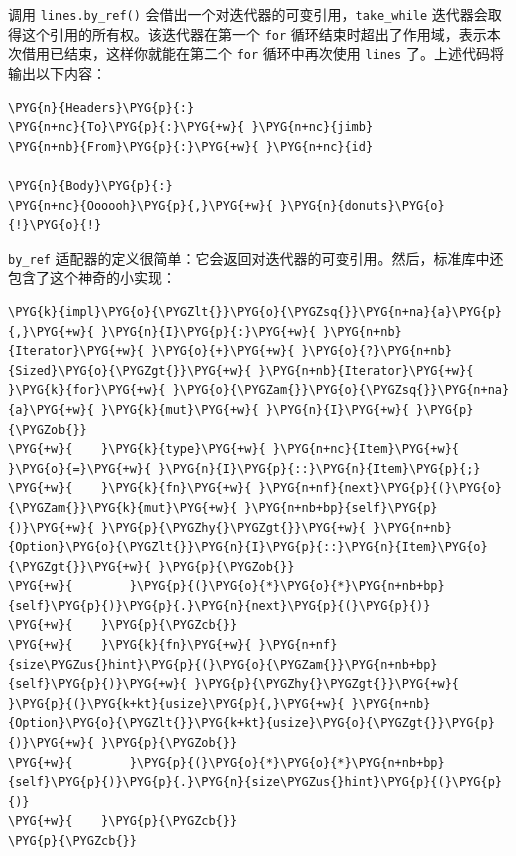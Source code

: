 调用 \texttt{lines.by\_ref()} 会借出一个对迭代器的可变引用，\texttt{take\_while} 迭代器会取得这个引用的所有权。该迭代器在第一个 \texttt{for} 循环结束时超出了作用域，表示本次借用已结束，这样你就能在第二个 \texttt{for} 循环中再次使用 \texttt{lines} 了。上述代码将输出以下内容：

\begin{Verbatim}[commandchars=\\\{\},breaklines=true,breakanywhere=true,fontsize=\codefont,xleftmargin=17bp]
\PYG{n}{Headers}\PYG{p}{:}
\PYG{n+nc}{To}\PYG{p}{:}\PYG{+w}{ }\PYG{n+nc}{jimb}
\PYG{n+nb}{From}\PYG{p}{:}\PYG{+w}{ }\PYG{n+nc}{id}

\PYG{n}{Body}\PYG{p}{:}
\PYG{n+nc}{Oooooh}\PYG{p}{,}\PYG{+w}{ }\PYG{n}{donuts}\PYG{o}{!}\PYG{o}{!}
\end{Verbatim}

\texttt{by\_ref} 适配器的定义很简单：它会返回对迭代器的可变引用。然后，标准库中还包含了这个神奇的小实现：

\begin{Verbatim}[commandchars=\\\{\},breaklines=true,breakanywhere=true,fontsize=\codefont,xleftmargin=17bp]
\PYG{k}{impl}\PYG{o}{\PYGZlt{}}\PYG{o}{\PYGZsq{}}\PYG{n+na}{a}\PYG{p}{,}\PYG{+w}{ }\PYG{n}{I}\PYG{p}{:}\PYG{+w}{ }\PYG{n+nb}{Iterator}\PYG{+w}{ }\PYG{o}{+}\PYG{+w}{ }\PYG{o}{?}\PYG{n+nb}{Sized}\PYG{o}{\PYGZgt{}}\PYG{+w}{ }\PYG{n+nb}{Iterator}\PYG{+w}{ }\PYG{k}{for}\PYG{+w}{ }\PYG{o}{\PYGZam{}}\PYG{o}{\PYGZsq{}}\PYG{n+na}{a}\PYG{+w}{ }\PYG{k}{mut}\PYG{+w}{ }\PYG{n}{I}\PYG{+w}{ }\PYG{p}{\PYGZob{}}
\PYG{+w}{    }\PYG{k}{type}\PYG{+w}{ }\PYG{n+nc}{Item}\PYG{+w}{ }\PYG{o}{=}\PYG{+w}{ }\PYG{n}{I}\PYG{p}{::}\PYG{n}{Item}\PYG{p}{;}
\PYG{+w}{    }\PYG{k}{fn}\PYG{+w}{ }\PYG{n+nf}{next}\PYG{p}{(}\PYG{o}{\PYGZam{}}\PYG{k}{mut}\PYG{+w}{ }\PYG{n+nb+bp}{self}\PYG{p}{)}\PYG{+w}{ }\PYG{p}{\PYGZhy{}\PYGZgt{}}\PYG{+w}{ }\PYG{n+nb}{Option}\PYG{o}{\PYGZlt{}}\PYG{n}{I}\PYG{p}{::}\PYG{n}{Item}\PYG{o}{\PYGZgt{}}\PYG{+w}{ }\PYG{p}{\PYGZob{}}
\PYG{+w}{        }\PYG{p}{(}\PYG{o}{*}\PYG{o}{*}\PYG{n+nb+bp}{self}\PYG{p}{)}\PYG{p}{.}\PYG{n}{next}\PYG{p}{(}\PYG{p}{)}
\PYG{+w}{    }\PYG{p}{\PYGZcb{}}
\PYG{+w}{    }\PYG{k}{fn}\PYG{+w}{ }\PYG{n+nf}{size\PYGZus{}hint}\PYG{p}{(}\PYG{o}{\PYGZam{}}\PYG{n+nb+bp}{self}\PYG{p}{)}\PYG{+w}{ }\PYG{p}{\PYGZhy{}\PYGZgt{}}\PYG{+w}{ }\PYG{p}{(}\PYG{k+kt}{usize}\PYG{p}{,}\PYG{+w}{ }\PYG{n+nb}{Option}\PYG{o}{\PYGZlt{}}\PYG{k+kt}{usize}\PYG{o}{\PYGZgt{}}\PYG{p}{)}\PYG{+w}{ }\PYG{p}{\PYGZob{}}
\PYG{+w}{        }\PYG{p}{(}\PYG{o}{*}\PYG{o}{*}\PYG{n+nb+bp}{self}\PYG{p}{)}\PYG{p}{.}\PYG{n}{size\PYGZus{}hint}\PYG{p}{(}\PYG{p}{)}
\PYG{+w}{    }\PYG{p}{\PYGZcb{}}
\PYG{p}{\PYGZcb{}}
\end{Verbatim}

